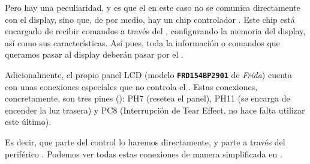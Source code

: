 \documentclass[../main.tex]{subfiles}
\begin{document}
        Pero hay una peculiaridad, y es que el  en este caso no se comunica directamente con el display, sino que, de por medio, hay un chip controlador \LCDMAN. Este chip está encargado de recibir comandos a través del , configurando la memoria del display, así como sus características. Así pues, toda la información o comandos que queramos pasar al display deberán pasar por el .

        Adicionalmente, el propio panel LCD (modelo \texttt{\textbf{FRD154BP2901}} de \emph{Frida}) cuenta con unas conexiones especiales que no controla el \LCDMAN. Estas conexiones, concretamente, son tres pines (\BRDMAN[Table 14]): PH7 (resetea el panel), PH11 (se encarga de encender la luz trasera) y PC8 (Interrupción de Tear Effect, no hace falta utilizar este último). 

        Es decir, que parte del control lo haremos directamente, y parte a través del periférico . Podemos ver todas estas conexiones de manera simplificada en .
\end{document}

